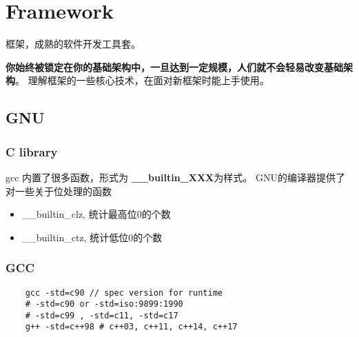 \clearpage
\part{Framework}
框架，成熟的软件开发工具套。

\textbf{你始终被锁定在你的基础架构中，一旦达到一定规模，人们就不会轻易改变基础架构}。
理解框架的一些核心技术，在面对新框架时能上手使用。

\chapter{GNU}

\section{C library}
gcc 内置了很多函数，形式为 \textbf{ \_\_builtin\_XXX}为样式。
GNU的编译器提供了对一些关于位处理的函数
\begin{itemize}
    \item { \_\_builtin\_clz, 统计最高位0的个数 }
    \item { \_\_builtin\_ctz, 统计低位0的个数}
\end{itemize}

\section{GCC}

\begin{lstlisting}
    gcc -std=c90 // spec version for runtime
    # -std=c90 or -std=iso:9899:1990
    # -std=c99 , -std=c11, -std=c17
    g++ -std=c++98 # c++03, c++11, c++14, c++17
\end{lstlisting}

